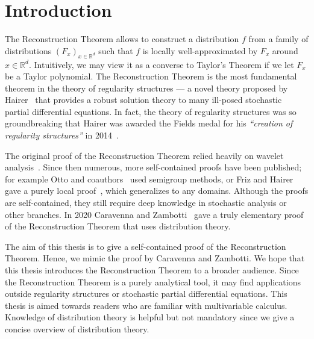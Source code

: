 \chapter{Introduction} 

The Reconstruction Theorem allows to construct a distribution \(f\) from a family of distributions \({(F_{x})}_{x \in \mathbb{R}^d}\) such that \(f\) is locally well-approximated by \(F_x\) around \(x \in \mathbb{R}^d\). Intuitively, we may view it as a converse to Taylor's Theorem if we let \(F_x\) be a Taylor polynomial. The Reconstruction Theorem is the most fundamental theorem in the theory of regularity structures --- a novel theory proposed by Hairer~\cite{hairer2014theory} that provides a robust solution theory to many ill-posed stochastic partial differential equations. In fact, the theory of regularity structures was so groundbreaking that Hairer was awarded the Fields medal for his \emph{``creation of regularity structures''} in 2014~\cite{FieldsMedalHairer}.

The original proof of the Reconstruction Theorem relied heavily on wavelet analysis~\cite{hairer2017reconstruction}. Since then numerous, more self-contained proofs have been published; for example Otto and coauthors~\cite{otto2019quasilinear} used semigroup methods, or Friz and Hairer gave a purely local proof~\cite{friz2020course}, which generalizes to any domains. Although the proofs are self-contained, they still require deep knowledge in stochastic analysis or other branches. In 2020 Caravenna and Zambotti~\cite{caravenna2021hairer} gave a truly elementary proof of the Reconstruction Theorem that uses distribution theory. 

The aim of this thesis is to give a self-contained proof of the Reconstruction Theorem. Hence, we mimic the proof by Caravenna and Zambotti. We hope that this thesis introduces the Reconstruction Theorem to a broader audience. Since the Reconstruction Theorem is a purely analytical tool, it may find applications outside regularity structures or stochastic partial differential equations. This thesis is aimed towards readers who are familiar with multivariable calculus. Knowledge of distribution theory is helpful but not mandatory since we give a concise overview of distribution theory.

